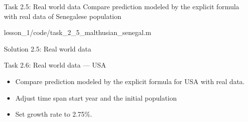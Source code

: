 \begin{frame}[fragile]{Task 2.5: Real world data}
    Compare prediction modeled by the explicit formula with real data of Senegalese population 
    \vfill
\scriptsize

{lesson_1/code/task_2_5_malthusian_senegal.m}
\end{frame}


\begin{frame}[fragile]{Solution 2.5: Real world data}
\end{frame}


\begin{frame}[fragile]{Task 2.6: Real world data --- USA}
\small
\begin{itemize}
    \item Compare prediction modeled by the explicit formula for USA with real data.
    \item Adjust time span start year and the initial population
    \item Set growth rate to 2.75\%.
\end{itemize}

\vfill
\tiny

\end{frame}

